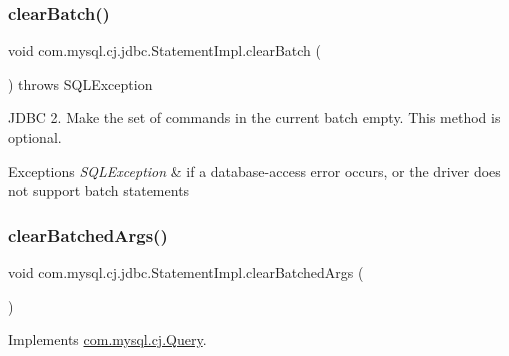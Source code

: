 \subsubsection{\texorpdfstring{clear\+Batch()}{clearBatch()}}
{\footnotesize\ttfamily void com.\+mysql.\+cj.\+jdbc.\+Statement\+Impl.\+clear\+Batch (\begin{DoxyParamCaption}{ }\end{DoxyParamCaption}) throws S\+Q\+L\+Exception}

J\+D\+BC 2. Make the set of commands in the current batch empty. This method is optional.


\begin{DoxyExceptions}{Exceptions}
{\em S\+Q\+L\+Exception} & if a database-\/access error occurs, or the driver does not support batch statements \\
\hline
\end{DoxyExceptions}
\mbox{\label{classcom_1_1mysql_1_1cj_1_1jdbc_1_1_statement_impl_a42618e455d715cde9a92efbc6922b252}} 
\subsubsection{\texorpdfstring{clear\+Batched\+Args()}{clearBatchedArgs()}}
{\footnotesize\ttfamily void com.\+mysql.\+cj.\+jdbc.\+Statement\+Impl.\+clear\+Batched\+Args (\begin{DoxyParamCaption}{ }\end{DoxyParamCaption})}



Implements \mbox{\hyperlink{interfacecom_1_1mysql_1_1cj_1_1_query_a72ab11f1338a67459c15b31d1e808b14}{com.\+mysql.\+cj.\+Query}}.

\mbox{\label{classcom_1_1mysql_1_1cj_1_1jdbc_1_1_statement_impl_a7356ed117aa4417ec6ce92292f53470b}} 
